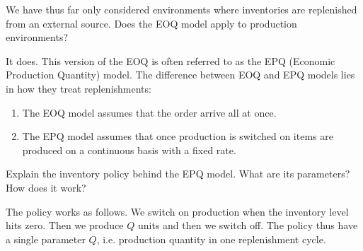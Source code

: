   

\begin{exercise}
We have thus far only considered environments where inventories are replenished from an external source. Does the EOQ model apply to production environments?


\begin{solution}
It does. This version of the EOQ is often referred to as the EPQ (Economic Production Quantity) model. The difference between EOQ and EPQ models lies in how they treat replenishments:
\begin{enumerate}
\item The EOQ model assumes that the order arrive all at once.
\item The EPQ model assumes that once production is switched on items are produced on a continuous basis with a fixed rate.
\end{enumerate}
\end{solution}
\end{exercise}

\begin{exercise}
Explain the inventory policy behind the EPQ model. What are its parameters? How does it work?


\begin{solution}
The policy works as follows. We switch on production when the inventory level hits zero. Then we produce $Q$ units and then we switch off. The policy thus have a single parameter $Q$, i.e. production quantity in one replenishment cycle. 
\end{solution}
\end{exercise}


